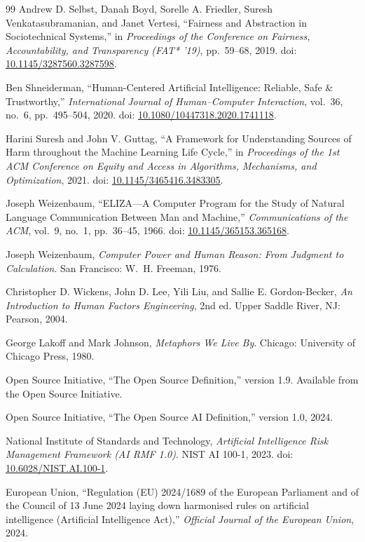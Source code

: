 \documentclass[11pt]{article}
\begin{document}
\begin{thebibliography}{99}
Andrew D. Selbst, Danah Boyd, Sorelle A. Friedler,
Suresh Venkatasubramanian, and Janet Vertesi,
``Fairness and Abstraction in Sociotechnical Systems,''
in \textit{Proceedings of the Conference on Fairness,
Accountability, and Transparency (FAT* '19)},
pp.~59--68, 2019.
doi: \href{https://doi.org/10.1145/3287560.3287598}
{10.1145/3287560.3287598}.

Ben Shneiderman,
``Human-Centered Artificial Intelligence:
Reliable, Safe \& Trustworthy,''
\textit{International Journal of Human--Computer Interaction},
vol.~36, no.~6, pp.~495--504, 2020.
doi: \href{https://doi.org/10.1080/10447318.2020.1741118}
{10.1080/10447318.2020.1741118}.

Harini Suresh and John V. Guttag,
``A Framework for Understanding Sources of Harm
throughout the Machine Learning Life Cycle,''
in \textit{Proceedings of the 1st ACM Conference on
Equity and Access in Algorithms, Mechanisms, and Optimization},
2021.
doi: \href{https://doi.org/10.1145/3465416.3483305}
{10.1145/3465416.3483305}.

Joseph Weizenbaum,
``ELIZA---A Computer Program for the Study of
Natural Language Communication Between Man and Machine,''
\textit{Communications of the ACM},
vol.~9, no.~1, pp.~36--45, 1966.
doi: \href{https://doi.org/10.1145/365153.365168}
{10.1145/365153.365168}.

Joseph Weizenbaum,
\textit{Computer Power and Human Reason:
From Judgment to Calculation}.
San Francisco: W.~H. Freeman, 1976.

Christopher D. Wickens, John D. Lee,
Yili Liu, and Sallie E. Gordon-Becker,
\textit{An Introduction to Human Factors Engineering},
2nd ed.
Upper Saddle River, NJ: Pearson, 2004.

George Lakoff and Mark Johnson,
\textit{Metaphors We Live By}.
Chicago: University of Chicago Press, 1980.

Open Source Initiative,
``The Open Source Definition,''
version 1.9.
Available from the Open Source Initiative.

Open Source Initiative,
``The Open Source AI Definition,''
version 1.0, 2024.

National Institute of Standards and Technology,
\textit{Artificial Intelligence Risk Management Framework
(AI RMF 1.0)}.
NIST AI 100-1, 2023.
doi: \href{https://doi.org/10.6028/NIST.AI.100-1}
{10.6028/NIST.AI.100-1}.

European Union,
``Regulation (EU) 2024/1689 of the European Parliament
and of the Council of 13 June 2024 laying down harmonised
rules on artificial intelligence (Artificial Intelligence Act),''
\textit{Official Journal of the European Union}, 2024.

\end{thebibliography}
\end{document}

